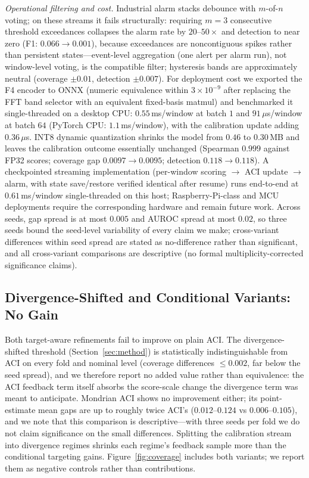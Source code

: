 \emph{Operational filtering and cost.} Industrial alarm stacks debounce with $m$-of-$n$ voting; on these streams it fails structurally: requiring $m{=}3$ consecutive threshold exceedances collapses the alarm rate by $20$--$50\times$ and detection to near zero (F1: $0.066\!\to\!0.001$), because exceedances are noncontiguous spikes rather than persistent states---event-level aggregation (one alert per alarm run), not window-level voting, is the compatible filter; hysteresis bands are approximately neutral (coverage $\pm0.01$, detection $\pm0.007$). For deployment cost we exported the F4 encoder to ONNX (numeric equivalence within $3\times10^{-9}$ after replacing the FFT band selector with an equivalent fixed-basis matmul) and benchmarked it single-threaded on a desktop CPU: $0.55$\,ms/window at batch $1$ and $91\,\mu$s/window at batch $64$ (PyTorch CPU: $1.1$\,ms/window), with the calibration update adding $0.36\,\mu$s. INT8 dynamic quantization shrinks the model from $0.46$ to $0.30$\,MB and leaves the calibration outcome essentially unchanged (Spearman $0.999$ against FP32 scores; coverage gap $0.0097\!\to\!0.0095$; detection $0.118\!\to\!0.118$). A checkpointed streaming implementation (per-window scoring $\to$ ACI update $\to$ alarm, with state save/restore verified identical after resume) runs end-to-end at $0.61$\,ms/window single-threaded on this host; Raspberry-Pi-class and MCU deployments require the corresponding hardware and remain future work. Across seeds, gap spread is at most $0.005$ and AUROC spread at most $0.02$, so three seeds bound the seed-level variability of every claim we make; cross-variant differences within seed spread are stated as no-difference rather than significant, and all cross-variant comparisons are descriptive (no formal multiplicity-corrected significance claims).


\subsection{Divergence-Shifted and Conditional Variants: No Gain}
Both target-aware refinements fail to improve on plain ACI. The divergence-shifted threshold (Section~\ref{sec:method}) is statistically indistinguishable from ACI on every fold and nominal level (coverage differences $\leq 0.002$, far below the seed spread), and we therefore report no added value rather than equivalence: the ACI feedback term itself absorbs the score-scale change the divergence term was meant to anticipate. Mondrian ACI shows no improvement either; its point-estimate mean gaps are up to roughly twice ACI's ($0.012$--$0.124$ vs $0.006$--$0.105$), and we note that this comparison is descriptive---with three seeds per fold we do not claim significance on the small differences. Splitting the calibration stream into divergence regimes shrinks each regime's feedback sample more than the conditional targeting gains. Figure~\ref{fig:coverage} includes both variants; we report them as negative controls rather than contributions.

